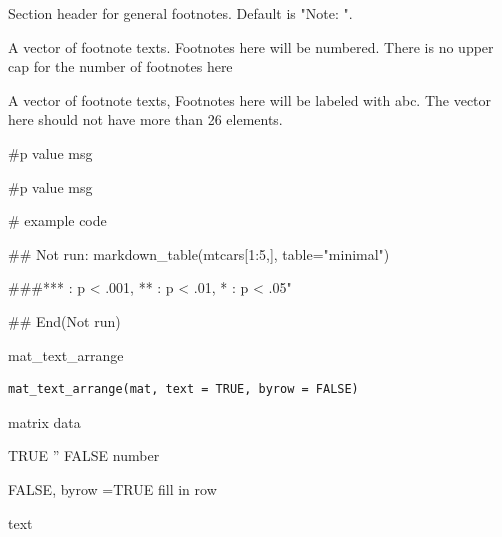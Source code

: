 \documentclass[a4paper]{book}
\begin{document}
\begin{Arguments}
\begin{ldescription}
\item[\code{general\_title}] Section header for general footnotes. Default is "Note: ".

\item[\code{number}] A vector of footnote texts. Footnotes here will be numbered. There is no upper cap for the number of footnotes here

\item[\code{alphabet}] A vector of footnote texts, Footnotes here will be labeled with abc. The vector here should not have more than 26 elements.

\item[\code{catout}] \#p value msg

\item[\code{general}] \#p value msg
\end{ldescription}
\end{Arguments}
%
\begin{Examples}
\begin{ExampleCode}
# example code

  ## Not run: 
  markdown_table(mtcars[1:5,], table="minimal")

  ###*** : p < .001, ** : p < .01, * : p < .05"
  
## End(Not run)
\end{ExampleCode}
\end{Examples}
%
\begin{Description}
mat\_text\_arrange
\end{Description}
%
\begin{Usage}
\begin{verbatim}
mat_text_arrange(mat, text = TRUE, byrow = FALSE)
\end{verbatim}
\end{Usage}
%
\begin{Arguments}
\begin{ldescription}
\item[\code{mat}] matrix data

\item[\code{text}] TRUE '' FALSE number

\item[\code{byrow}] FALSE, byrow =TRUE fill in row
\end{ldescription}
\end{Arguments}
%
\begin{Value}
text
\end{Value}
%
\end{document}
